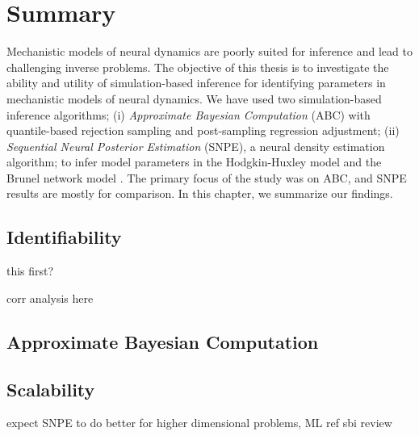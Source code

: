 \chapter{Summary}\label{chap:summary}

Mechanistic models of neural dynamics are poorly suited for inference and lead to challenging inverse problems. The objective of this thesis is to investigate the ability and utility of simulation-based inference for identifying parameters in mechanistic models of neural dynamics. We have used two simulation-based inference algorithms; (i) \textit{Approximate Bayesian Computation} (ABC) with quantile-based rejection sampling and post-sampling regression adjustment; (ii) \textit{Sequential Neural Posterior Estimation} (SNPE), a neural density estimation algorithm; to infer model parameters in the Hodgkin-Huxley model \cite{HH1952} and the Brunel network model \cite{Brunel2000}. The primary focus of the study was on ABC, and SNPE results are mostly for comparison. In this chapter, we summarize our findings. 

\section{Identifiability}

this first?

corr analysis here

\section{Approximate Bayesian Computation}


\section{Scalability}

expect SNPE to do better for higher dimensional problems, ML ref sbi review

